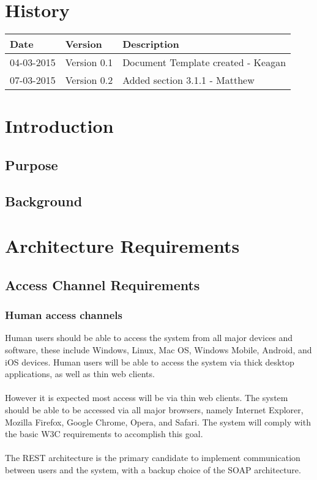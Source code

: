 \documentclass[12pt]{article}
\begin{document}


\section{History}
\begin{tabular}{|l|l|l|}
\hline
Date & Version & Description\\
\hline
04-03-2015 & Version 0.1 & Document Template created - Keagan\\
\hline
07-03-2015 & Version 0.2 & Added section 3.1.1 - Matthew\\
\hline


\end{tabular}

\newpage
\tableofcontents
\newpage
\listoffigures
\newpage

\section{Introduction}

\subsection{Purpose}

\subsection{Background}

\section{Architecture Requirements}
\subsection{Access Channel Requirements}
\subsubsection{Human access channels}
Human users should be able to access the system from all major devices and software, these include Windows, Linux, Mac OS, Windows Mobile, Android, and iOS devices. Human users will be able to access the system via thick desktop applications, as well as thin web clients. 
\\\\However it is expected most access will be via thin web clients.
The system should be able to be accessed via all major browsers, namely Internet Explorer, Mozilla Firefox, Google Chrome, Opera, and Safari. The system will comply with the basic W3C requirements to accomplish this goal.
\\\\The REST architecture is the primary candidate to implement communication between users and the system, with a backup choice of the SOAP architecture.
\end{document}
